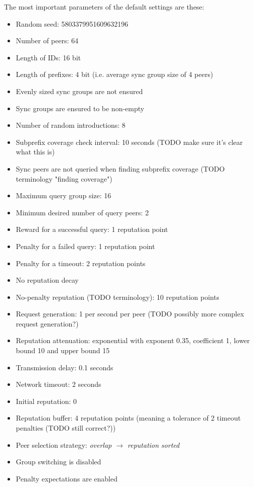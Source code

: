 The most important parameters of the default settings are these:
\begin{itemize}
\item Random seed: 5803379951609632196
\item Number of peers: 64
\item Length of IDs: 16 bit
\item Length of prefixes: 4 bit (i.e. average sync group size of 4 peers)
\item Evenly sized sync groups are not ensured
\item Sync groups are ensured to be non-empty
\item Number of random introductions: 8
\item Subprefix coverage check interval: 10 seconds (TODO make sure it's clear
      what this is)
\item Sync peers are not queried when finding subprefix coverage (TODO
      terminology "finding coverage")
\item Maximum query group size: 16
\item Minimum desired number of query peers: 2
\item Reward for a successful query: 1 reputation point
\item Penalty for a failed query: 1 reputation point
\item Penalty for a timeout: 2 reputation points
\item No reputation decay
\item No-penalty reputation (TODO terminology): 10 reputation points
\item Request generation: 1 per second per peer (TODO possibly more complex
      request generation?)
\item Reputation attenuation: exponential with exponent 0.35, coefficient 1,
      lower bound 10 and upper bound 15
\item Transmission delay: 0.1 seconds
\item Network timeout: 2 seconds
\item Initial reputation: 0
\item Reputation buffer: 4 reputation points (meaning a tolerance of 2 timeout
      penalties (TODO still correct?))
\item Peer selection strategy: \emph{overlap $\rightarrow$ reputation sorted}
\item Group switching is disabled
\item Penalty expectations are enabled
\end{itemize}

